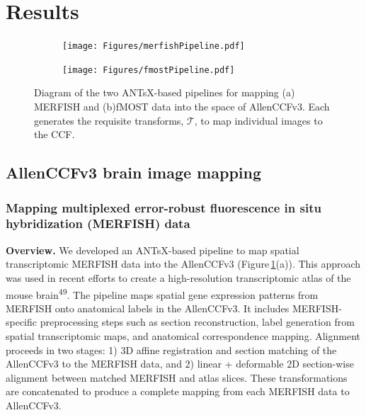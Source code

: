 \documentclass[
  12pt,
]{article}
\begin{document}
\clearpage
\newpage

\section{Results}\label{results}

\begin{figure}
\centering
\begin{subfigure}[t]{0.49\textwidth}
\centering
\texttt{[image: Figures/merfishPipeline.pdf]}
\caption{}
\end{subfigure} 
\begin{subfigure}[t]{0.49\textwidth}
\centering
\texttt{[image: Figures/fmostPipeline.pdf]}
\caption{}
\end{subfigure}
\caption{Diagram of the two ANTsX-based pipelines for mapping (a) MERFISH
          and (b)fMOST data into the space of AllenCCFv3.  Each generates
         the requisite transforms, $\mathcal{T}$, to map individual images
         to the CCF.}
\label{fig:allenpipelines}
\end{figure}

\subsection{AllenCCFv3 brain image
mapping}\label{allenccfv3-brain-image-mapping}

\subsubsection{Mapping multiplexed error-robust fluorescence in situ
hybridization (MERFISH)
data}\label{mapping-multiplexed-error-robust-fluorescence-in-situ-hybridization-merfish-data}

\textbf{Overview.} We developed an ANTsX-based pipeline to map spatial
transcriptomic MERFISH data into the AllenCCFv3
(Figure\,\ref{fig:allenpipelines}(a)). This approach was used in recent
efforts to create a high-resolution transcriptomic atlas of the mouse
brain\textsuperscript{49}. The pipeline maps spatial gene expression
patterns from MERFISH onto anatomical labels in the AllenCCFv3. It
includes MERFISH-specific preprocessing steps such as section
reconstruction, label generation from spatial transcriptomic maps, and
anatomical correspondence mapping. Alignment proceeds in two stages: 1)
3D affine registration and section matching of the AllenCCFv3 to the
MERFISH data, and 2) linear + deformable 2D section-wise alignment
between matched MERFISH and atlas slices. These transformations are
concatenated to produce a complete mapping from each MERFISH data to
AllenCCFv3.
\end{document}
